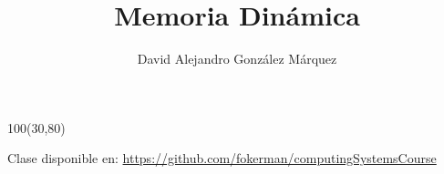 \documentclass[aspectratio=169]{beamer}
\title{\Huge Memoria Dinámica}
\author{David Alejandro González Márquez}
\date{}
\begin{document}
\begin{frame}[plain]
    \titlepage
    \begin{textblock}{100}(30,80)
    \begin{tcolorbox}[size=small,width=\textwidth,colback={gray!30},title={}]
    \begin{center}
     \scriptsize Clase disponible en: \url{https://github.com/fokerman/computingSystemsCourse}
    \end{center}
    \end{tcolorbox}
    \end{textblock}
\end{frame}
\end{document}
